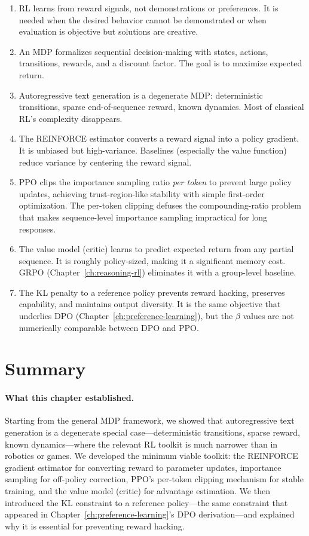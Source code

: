 \begin{takeaways}
\begin{enumerate}
  \item RL learns from reward signals, not demonstrations or preferences. It is needed when the desired behavior cannot be demonstrated or when evaluation is objective but solutions are creative.
  \item An MDP formalizes sequential decision-making with states, actions, transitions, rewards, and a discount factor. The goal is to maximize expected return.
  \item Autoregressive text generation is a degenerate MDP: deterministic transitions, sparse end-of-sequence reward, known dynamics. Most of classical RL's complexity disappears.
  \item The REINFORCE estimator converts a reward signal into a policy gradient. It is unbiased but high-variance. Baselines (especially the value function) reduce variance by centering the reward signal.
  \item PPO clips the importance sampling ratio \emph{per token} to prevent large policy updates, achieving trust-region-like stability with simple first-order optimization. The per-token clipping defuses the compounding-ratio problem that makes sequence-level importance sampling impractical for long responses.
  \item The value model (critic) learns to predict expected return from any partial sequence. It is roughly policy-sized, making it a significant memory cost. GRPO (Chapter~\ref{ch:reasoning-rl}) eliminates it with a group-level baseline.
  \item The KL penalty to a reference policy prevents reward hacking, preserves capability, and maintains output diversity. It is the same objective that underlies DPO (Chapter~\ref{ch:preference-learning}), but the $\beta$ values are not numerically comparable between DPO and PPO.
\end{enumerate}
\end{takeaways}


\section*{Summary}

\paragraph{What this chapter established.} Starting from the general MDP framework, we showed that autoregressive text generation is a degenerate special case---deterministic transitions, sparse reward, known dynamics---where the relevant RL toolkit is much narrower than in robotics or games. We developed the minimum viable toolkit: the REINFORCE gradient estimator for converting reward to parameter updates, importance sampling for off-policy correction, PPO's per-token clipping mechanism for stable training, and the value model (critic) for advantage estimation. We then introduced the KL constraint to a reference policy---the same constraint that appeared in Chapter~\ref{ch:preference-learning}'s DPO derivation---and explained why it is essential for preventing reward hacking.

